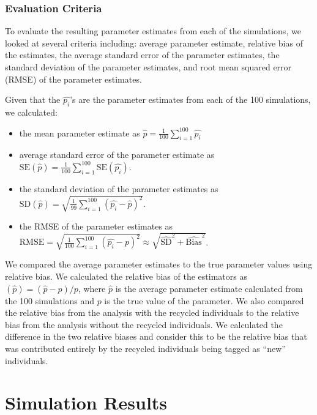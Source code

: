 \documentclass[12pt]{article}
\providecommand{\tightlist}{%
  \setlength{\itemsep}{0pt}\setlength{\parskip}{0pt}}
\begin{document}
\subsubsection{Evaluation Criteria}\label{evaluation-criteria}

To evaluate the resulting parameter estimates from each of the simulations, we looked at several criteria including: average parameter
estimate, relative bias of the estimates, the average standard error of
the parameter estimates, the standard deviation of the parameter
estimates, and root mean squared error (RMSE) of the parameter
estimates.

Given that the \(\hat{p_i}\)'s are the parameter estimates from each of
the 100 simulations, we calculated:

\begin{itemize}
\tightlist
\item
  the mean parameter estimate as
  \(\hat{p}= \frac{1}{100} \sum_{i=1}^{100} \hat{p_i}\)
\item
  average standard error of the parameter estimate as
  \(\text{SE}(\hat{p})= \frac{1}{100} \sum_{i=1}^{100} \text{SE}(\hat{p_i})\).
\item
  the standard deviation of the parameter estimates as
  \(\text{SD}(\hat{p})= \sqrt{\frac{1}{99} \sum_{i=1}^{100} (\hat{p_i}-\hat{p})^2}\).
\item
  the RMSE of the parameter estimates as
  \(\text{RMSE}= \sqrt{\frac{1}{100} \sum_{i=1}^{100} (\hat{p_i}-p)^2} \approx \sqrt{\hat{\text{SD}}^2+\hat{\text{Bias}}^2}\).
\end{itemize}

We compared the average parameter estimates  to the true parameter
values using relative bias. We calculated the relative bias of the
estimators as \(\left(\hat{p}\right) =(\hat{p} -p)/p\), where
\(\hat{p}\) is the average parameter estimate calculated from the 100
simulations and \(p\) is the true value of the parameter. We also
compared the relative bias from the analysis with the recycled
individuals to the relative bias from the analysis without the recycled
individuals. We calculated the difference in the two relative biases and
consider this to be the relative bias that was contributed entirely by the
recycled individuals being tagged as ``new'' individuals.




\section{Simulation Results}\label{results}
\end{document}
